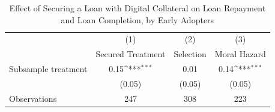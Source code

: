 \begin{table}[htbp]\centering
\def\sym#1{\ifmmode^{#1}\else\(^{#1}\)\fi}
\caption{Effect of Securing a Loan with Digital Collateral on Loan Repayment and Loan Completion, by Early Adopters\label{LASMH\_repay\_earlyadopt\_ITT\_100}}
\begin{tabular}{l*{3}{c}}
\toprule
                    &\multicolumn{1}{c}{(1)}&\multicolumn{1}{c}{(2)}&\multicolumn{1}{c}{(3)}\\
                    &\multicolumn{1}{c}{Secured Treatment}&\multicolumn{1}{c}{Selection}&\multicolumn{1}{c}{Moral Hazard}\\
\midrule
Subsample treatment &        0.15\sym{***}&        0.01         &        0.14\sym{***}\\
                    &      (0.05)         &      (0.05)         &      (0.05)         \\
\midrule
Observations        &         247         &         308         &         223         \\
\bottomrule
\end{tabular}
\end{table}

